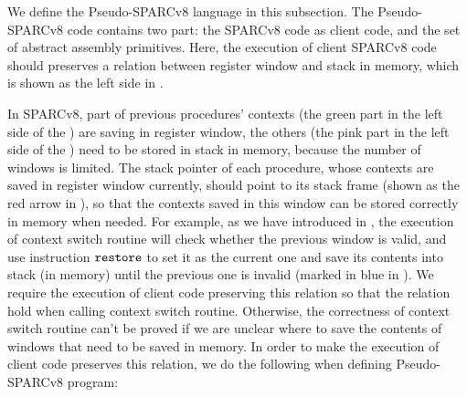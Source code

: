 We define the Pseudo-SPARCv8 language in this 
subsection. The Pseudo-SPARCv8 code contains 
two part: the SPARCv8 code as client code, 
and the set of abstract assembly primitives. 
Here, the execution of client SPARCv8 code 
should preserves a relation between register 
window and stack in memory, which is shown 
as the left side in \Fig{\ref{fig:Abstraction of Register Windows and Memory}}.
\begin{center}
    
    \label{fig:Abstraction of Register Windows and Memory}
    \vspace{-0.5em}
\end{center}
In SPARCv8, part of previous 
procedures' contexts 
(the green part in the left side of the 
\Fig{\ref{fig:Abstraction of Register Windows and Memory}}) 
are saving in register window, the others 
(the pink part in the left side of the 
\Fig{\ref{fig:Abstraction of Register Windows and Memory}})
need to be stored in stack in memory, 
because the number of windows is limited. 
The stack pointer of each procedure, 
whose contexts are saved in register 
window currently, should point to its stack frame 
(shown as the red arrow in 
\Fig{\ref{fig:Abstraction of Register Windows and Memory}}),
so that the contexts saved 
in this window can be stored correctly 
in memory when needed. For example, as we have 
introduced in \Sec{\ref{sec:ctxswitch}}, the 
execution of context switch routine will check 
whether the previous window is valid, and use 
instruction $\texttt{restore}{}$ to set it as the 
current one and save its contents into stack 
(in memory) until the previous one is invalid 
(marked in blue in \Fig{\ref{fig:Abstraction of Register Windows and Memory}}). 
We require the execution of client code 
preserving this relation so that the relation 
hold when calling context switch routine. 
Otherwise, the correctness of context switch 
routine can't be proved if we are unclear where 
to save the contents of windows that need to 
be saved in memory. In order to make the execution 
of client code preserves this relation, we do 
the following when defining Pseudo-SPARCv8 program: 
